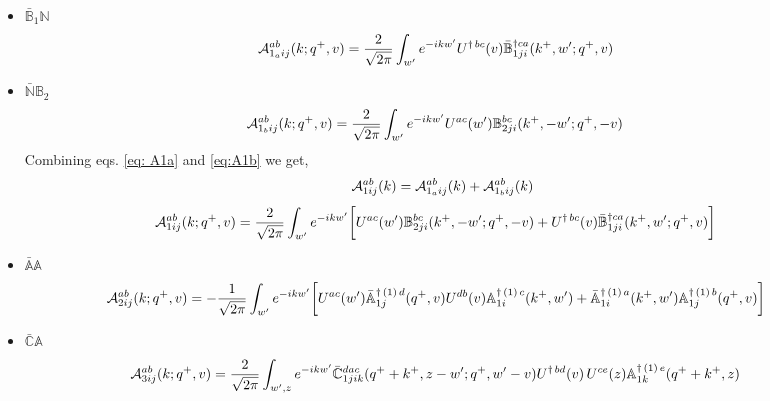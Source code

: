 \documentclass[aps,prd,amsmath,amssymb,nofootinbib]{revtex4-2}
\def\mf#1{\mathbb{#1}}
\numberwithin{equation}{section}
\begin{document}
\begin{itemize}
\item $\bar{\mf{B}}_{1} \mf{N}$
\begin{align}\label{eq: A1a}
    {\cal A}^{ab}_{1_{a}ij}(k; q^{+},v) & = \frac{2}{\sqrt{2\pi}}\int_{w^{\prime}}e^{-i k w^\prime} U^{\dagger\, bc}(v)\Bar{\mf{B}}^{\dagger ca}_{1ji}(k^{+},w^{\prime};q^{+},v)
\end{align}
 \item $\bar{{\mf{N}}}\mf{B}_{2}$
\begin{align} \label{eq:A1b}
        {\cal A}^{ab}_{1_{b}ij}(k; q^{+},v) & = \frac{2}{\sqrt{2\pi}}  \int_{w^{\prime}}e^{-i k w^\prime}U^{ac}(w^{\prime}) \mf{B}^{bc}_{2ji}(k^{+},-w^{\prime};q^{+},-v)
    \end{align}
Combining eqs. \eqref{eq: A1a} and \eqref{eq:A1b} we get,
$${\cal A}^{ab}_{1ij}(k) = {\cal A}^{ab}_{1_{a}ij}(k) + {\cal A}^{ab}_{1_{b}ij}(k)$$
\begin{align}
     {\cal A}^{ab}_{1ij}(k; q^{+},v) & = \frac{2}{\sqrt{2\pi}} \int_{w^{\prime}}e^{-i k w^\prime}\bigg[U^{ac}(w^{\prime}) \mf{B}^{bc}_{2ji}(k^{+},-w^{\prime};q^{+},-v)+U^{\dagger\, bc}(v)\Bar{\mf{B}}^{\dagger ca}_{1ji}(k^{+},w^{\prime};q^{+},v)\bigg]
\end{align}
   \item $\bar{{\mf{A}}} \mf{A}$
\begin{align} 
     {\cal A}^{ab}_{2ij}(k; q^{+},v) & = -\frac{1}{\sqrt{2\pi}} \int_{w^{\prime}} e^{-ikw^{\prime}}\bigg[U^{ac}(w^{\prime}) \Bar{\mf{A}}^{\dagger\,(1)\, d}_{1j}(q^{+},v)U^{ db}(v) \mf{A}^{\dagger\,(1)\, c}_{1i}(k^{+},w^{\prime})+\Bar{\mf{A}}^{\dagger\,(1)\, a}_{1i}(k^{+},w^{\prime}) \mf{A}^{\dagger\,(1)\, b}_{1j}(q^{+},v)\bigg] 
\end{align}
\item $\bar{{\mf{C}}} \mf{A}$
    \begin{align}
         {\cal A}^{ab}_{3ij}(k; q^{+},v) & = \frac{2}{\sqrt{2\pi}}  \int_{w^{\prime},z} e^{-i k w^\prime}\Bar{\mf{C}}^{dac}_{1jik}(q^{+}+k^{+},z-w^{\prime}; q^{+},w^{\prime}-v)U^{\dagger\, bd}(v)\,U^{ce}(z) \mf{A}^{\dagger\,(1)\,e}_{1k}(q^{+}+k^{+},z)
    \end{align}
\end{itemize}
\end{document}

